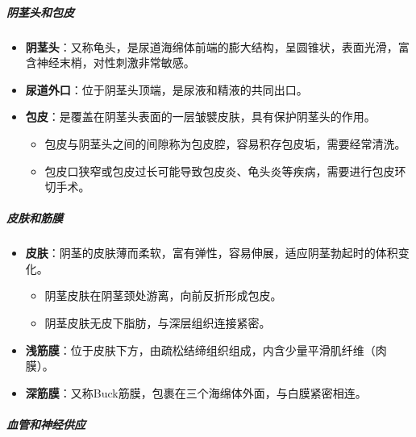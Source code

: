 \subparagraph{阴茎头和包皮}
\begin{itemize}
\item \textbf{阴茎头}：又称龟头，是尿道海绵体前端的膨大结构，呈圆锥状，表面光滑，富含神经末梢，对性刺激非常敏感。
\item \textbf{尿道外口}：位于阴茎头顶端，是尿液和精液的共同出口。
\item \textbf{包皮}：是覆盖在阴茎头表面的一层皱襞皮肤，具有保护阴茎头的作用。
  \begin{itemize}
  \item 包皮与阴茎头之间的间隙称为包皮腔，容易积存包皮垢，需要经常清洗。
  \item 包皮口狭窄或包皮过长可能导致包皮炎、龟头炎等疾病，需要进行包皮环切手术。
  \end{itemize}
\end{itemize}

\subparagraph{皮肤和筋膜}
\begin{itemize}
\item \textbf{皮肤}：阴茎的皮肤薄而柔软，富有弹性，容易伸展，适应阴茎勃起时的体积变化。
  \begin{itemize}
  \item 阴茎皮肤在阴茎颈处游离，向前反折形成包皮。
  \item 阴茎皮肤无皮下脂肪，与深层组织连接紧密。
  \end{itemize}
\item \textbf{浅筋膜}：位于皮肤下方，由疏松结缔组织组成，内含少量平滑肌纤维（肉膜）。
\item \textbf{深筋膜}：又称Buck筋膜，包裹在三个海绵体外面，与白膜紧密相连。
\end{itemize}

\subparagraph{血管和神经供应}

